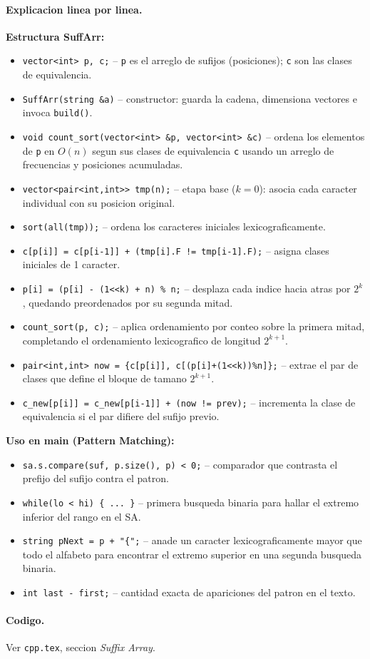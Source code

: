 \paragraph{Explicacion linea por linea.}
\textbf{Estructura SuffArr:}
\begin{itemize}\setlength\itemsep{0pt}
	\item \verb|vector<int> p, c;| -- \verb|p| es el arreglo de sufijos (posiciones); \verb|c| son las clases de equivalencia.
	\item \verb|SuffArr(string &a)| -- constructor: guarda la cadena, dimensiona vectores e invoca \verb|build()|.
	\item \verb|void count_sort(vector<int> &p, vector<int> &c)| -- ordena los elementos de \verb|p| en $O(n)$ segun sus clases de equivalencia \verb|c| usando un arreglo de frecuencias y posiciones acumuladas.
	\item \verb|vector<pair<int,int>> tmp(n);| -- etapa base ($k=0$): asocia cada caracter individual con su posicion original.
	\item \verb|sort(all(tmp));| -- ordena los caracteres iniciales lexicograficamente.
	\item \verb|c[p[i]] = c[p[i-1]] + (tmp[i].F != tmp[i-1].F);| -- asigna clases iniciales de 1 caracter.
	\item \verb|p[i] = (p[i] - (1<<k) + n) % n;| -- desplaza cada indice hacia atras por $2^k$, quedando preordenados por su segunda mitad.
	\item \verb|count_sort(p, c);| -- aplica ordenamiento por conteo sobre la primera mitad, completando el ordenamiento lexicografico de longitud $2^{k+1}$.
	\item \verb|pair<int,int> now = {c[p[i]], c[(p[i]+(1<<k))%n]};| -- extrae el par de clases que define el bloque de tamano $2^{k+1}$.
	\item \verb|c_new[p[i]] = c_new[p[i-1]] + (now != prev);| -- incrementa la clase de equivalencia si el par difiere del sufijo previo.
\end{itemize}
\textbf{Uso en main (Pattern Matching):}
\begin{itemize}\setlength\itemsep{0pt}
	\item \verb|sa.s.compare(suf, p.size(), p) < 0;| -- comparador que contrasta el prefijo del sufijo contra el patron.
	\item \verb|while(lo < hi) { ... }| -- primera busqueda binaria para hallar el extremo inferior del rango en el SA.
	\item \verb|string pNext = p + "{";| -- anade un caracter lexicograficamente mayor que todo el alfabeto para encontrar el extremo superior en una segunda busqueda binaria.
	\item \verb|int last - first;| -- cantidad exacta de apariciones del patron en el texto.
\end{itemize}

\paragraph{Codigo.}
Ver \texttt{cpp.tex}, seccion \textit{Suffix Array}.

\vspace{0.5em}
